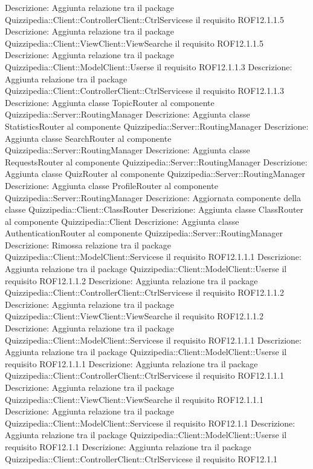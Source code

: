 Descrizione: Aggiunta relazione tra il package Quizzipedia::Client::ControllerClient::CtrlServicese il requisito ROF12.1.1.5 
Descrizione: Aggiunta relazione tra il package Quizzipedia::Client::ViewClient::ViewSearche il requisito ROF12.1.1.5 
Descrizione: Aggiunta relazione tra il package Quizzipedia::Client::ModelClient::Userse il requisito ROF12.1.1.3 
Descrizione: Aggiunta relazione tra il package Quizzipedia::Client::ControllerClient::CtrlServicese il requisito ROF12.1.1.3 
Descrizione: Aggiunta classe TopicRouter al componente Quizzipedia::Server::RoutingManager 
Descrizione: Aggiunta classe StatisticsRouter al componente Quizzipedia::Server::RoutingManager 
Descrizione: Aggiunta classe SearchRouter al componente Quizzipedia::Server::RoutingManager 
Descrizione: Aggiunta classe RequestsRouter al componente Quizzipedia::Server::RoutingManager 
Descrizione: Aggiunta classe QuizRouter al componente Quizzipedia::Server::RoutingManager 
Descrizione: Aggiunta classe ProfileRouter al componente Quizzipedia::Server::RoutingManager 
Descrizione: Aggiornata componente della classe Quizzipedia::Client::ClassRouter 
Descrizione: Aggiunta classe ClassRouter al componente Quizzipedia::Client 
Descrizione: Aggiunta classe AuthenticationRouter al componente Quizzipedia::Server::RoutingManager 
Descrizione: Rimossa relazione tra il package Quizzipedia::Client::ModelClient::Servicese il requisito ROF12.1.1.1 
Descrizione: Aggiunta relazione tra il package Quizzipedia::Client::ModelClient::Userse il requisito ROF12.1.1.2 
Descrizione: Aggiunta relazione tra il package Quizzipedia::Client::ControllerClient::CtrlServicese il requisito ROF12.1.1.2 
Descrizione: Aggiunta relazione tra il package Quizzipedia::Client::ViewClient::ViewSearche il requisito ROF12.1.1.2 
Descrizione: Aggiunta relazione tra il package Quizzipedia::Client::ModelClient::Servicese il requisito ROF12.1.1.1 
Descrizione: Aggiunta relazione tra il package Quizzipedia::Client::ModelClient::Userse il requisito ROF12.1.1.1 
Descrizione: Aggiunta relazione tra il package Quizzipedia::Client::ControllerClient::CtrlServicese il requisito ROF12.1.1.1 
Descrizione: Aggiunta relazione tra il package Quizzipedia::Client::ViewClient::ViewSearche il requisito ROF12.1.1.1 
Descrizione: Aggiunta relazione tra il package Quizzipedia::Client::ModelClient::Servicese il requisito ROF12.1.1 
Descrizione: Aggiunta relazione tra il package Quizzipedia::Client::ModelClient::Userse il requisito ROF12.1.1 
Descrizione: Aggiunta relazione tra il package Quizzipedia::Client::ControllerClient::CtrlServicese il requisito ROF12.1.1 
